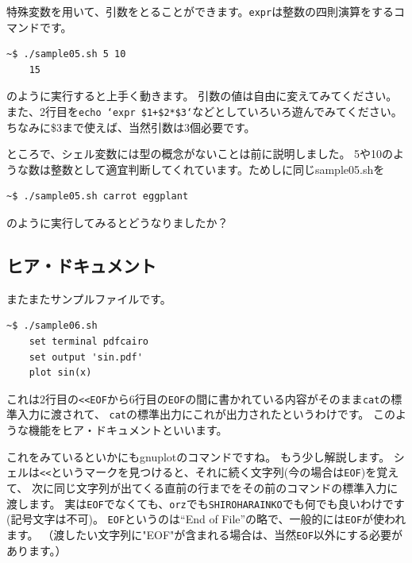 \documentclass[a4j]{ltjreport}
\begin{document}
    特殊変数を用いて、引数をとることができます。\texttt{expr}は整数の四則演算をするコマンドです。
    
    \begin{lstlisting}[numbers=none]
    ~$ ./sample05.sh 5 10
    15
    \end{lstlisting}
    のように実行すると上手く動きます。
    引数の値は自由に変えてみてください。
    また、2行目を\texttt{echo `expr \$1+\$2*\$3`}などとしていろいろ遊んでみてください。
    ちなみに\$3まで使えば、当然引数は3個必要です。

    ところで、シェル変数には型の概念がないことは前に説明しました。
    5や10のような数は整数として適宜判断してくれています。ためしに同じsample05.shを
    \begin{lstlisting}[numbers=none]
    ~$ ./sample05.sh carrot eggplant
    \end{lstlisting}
    のように実行してみるとどうなりましたか？

    \subsection{ヒア・ドキュメント}
    またまたサンプルファイルです。
    

    \begin{lstlisting}[numbers=none]
    ~$ ./sample06.sh 
    set terminal pdfcairo
    set output 'sin.pdf'
    plot sin(x)
    \end{lstlisting}

    これは2行目の\texttt{<<EOF}から6行目の\texttt{EOF}の間に書かれている内容がそのまま\texttt{cat}の標準入力に渡されて、
    \texttt{cat}の標準出力にこれが出力されたというわけです。
    このような機能をヒア・ドキュメントといいます。

    これをみているといかにもgnuplotのコマンドですね。
    もう少し解説します。
    シェルは\texttt{<<}というマークを見つけると、それに続く文字列(今の場合は\texttt{EOF})を覚えて、
    次に同じ文字列が出てくる直前の行までをその前のコマンドの標準入力に渡します。
    実は\texttt{EOF}でなくても、\texttt{orz}でも\texttt{SHIROHARAINKO}でも何でも良いわけです(記号文字は不可)。
    \texttt{EOF}というのは``End of File''の略で、一般的には\texttt{EOF}が使われます。
    （渡したい文字列に"EOF"が含まれる場合は、当然\texttt{EOF}以外にする必要があります。）
\end{document}
